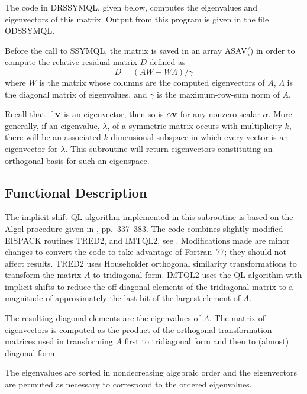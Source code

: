 \documentclass[twoside]{MATH77}
\begin{document}
The code in DRSSYMQL, given below, computes the eigenvalues and eigenvectors
of this matrix. Output from this program is given in the file ODSSYMQL.

Before the call to SSYMQL, the matrix is saved in an array ASAV() in order
to compute the relative residual matrix $D$ defined as%
\begin{equation*}
D=\left( AW-W\Lambda \right) /\gamma
\end{equation*}
where $W$ is the matrix whose columns are the computed eigenvectors
of $A$, $\Lambda $ is the diagonal matrix of eigenvalues,
and $\gamma $ is the maximum-row-sum norm of $A$.

Recall that if ${\bf v}$ is an eigenvector, then so is $\alpha {\bf
v}$ for any nonzero scalar $\alpha$.  More generally, if an
eigenvalue, $\lambda$, of a symmetric matrix occurs with multiplicity
$k$, there will be an associated  $k$-dimensional subspace in which
every vector is an eigenvector for $\lambda$.  This subroutine will
return eigenvectors constituting an orthogonal basis for such an
eigenspace.

\subsection{Functional Description}

The implicit-shift QL algorithm implemented in this subroutine is based on
the Algol procedure given in \cite{Dubrelle:1968:IQR}, pp.~337--383.  The
code combines slightly modified EISPACK routines TRED2, and IMTQL2, see
\cite{Smith:1974:MER}.  Modifications made are minor changes to convert
the code to take advantage of Fortran~77; they should not affect results.
TRED2 uses Householder orthogonal similarity transformations to transform
the matrix $A$ to tridiagonal form.  IMTQL2 uses the QL algorithm with
implicit shifts to reduce the off-diagonal elements of the tridiagonal
matrix to a magnitude of approximately the last bit of the largest element
of $A$.

The resulting diagonal elements are the eigenvalues of $A$. The matrix of
eigenvectors is computed as the product of the orthogonal transformation
matrices used in transforming $A$ first to tridiagonal form and then to
(almost) diagonal form.

The eigenvalues are sorted in nondecreasing algebraic order and the
eigenvectors are permuted as necessary to correspond to the ordered
eigenvalues.



\end{document}
